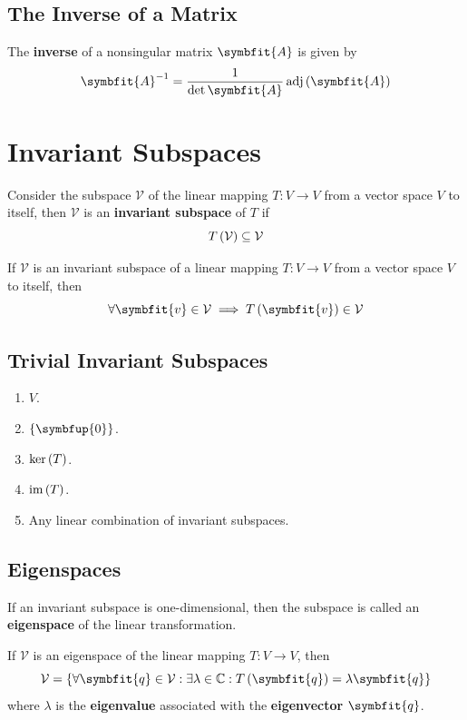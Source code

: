 \documentclass{article}
\begin{document}
	\subsection{The Inverse of a Matrix}
	\begin{theorem}
		The \textbf{inverse} of a nonsingular matrix $\symbfit{A}$ is given by 
		\begin{equation*}
			\symbfit{A}^{-1}=\frac{1}{\det{\symbfit{A}}} \adj{\left( \symbfit{A} \right)}
		\end{equation*}
	\end{theorem}
	\newpage
\section{Invariant Subspaces}
	\begin{definition}
		Consider the subspace $\mathcal{V}$ of the linear mapping $T:V\rightarrow V$ from a vector space $V$ to itself, then $\mathcal{V}$ is an \textbf{invariant subspace} of $T$ if
		\begin{equation*}
			{T}\left({\mathcal{V}}\right)\subseteq \mathcal{V}
		\end{equation*}
	\end{definition}
	\begin{theorem}
		If $\mathcal{V}$ is an invariant subspace of a linear mapping $T: V \rightarrow V$ from a vector space $V$ to itself, then
		\begin{equation*}
			\forall \symbfit{v}\in \mathcal{V}\implies \func{T}{\symbfit{v}}\in \mathcal{V}
		\end{equation*}
	\end{theorem}
	\subsection{Trivial Invariant Subspaces}
	\begin{enumerate}
		\item $V$.
		\item $\left\{ \symbfup{0} \right\}$.
		\item $\operatorname{ker}{\left( T \right)}$.
		\item $\operatorname{im}{\left( T \right)}$.
		\item Any linear combination of invariant subspaces.
	\end{enumerate}
	\subsection{Eigenspaces}
	\begin{definition}
		If an invariant subspace is one-dimensional, then the subspace is called an \textbf{eigenspace} of the linear transformation.
	\end{definition}
	\begin{theorem}
		If $\mathcal{V}$ is an eigenspace of the linear mapping $T: V \rightarrow V$, then
		\begin{equation*}
			\mathcal{V} = \left\{ \forall \symbfit{q}\in \mathcal{V}:\exists \lambda \in \mathbb{C}:\func{T}{\symbfit{q}}=\lambda \symbfit{q} \right\}
		\end{equation*}
		where $\lambda$ is the \textbf{eigenvalue} associated with the \textbf{eigenvector} $\symbfit{q}$.
	\end{theorem}
\end{document}
